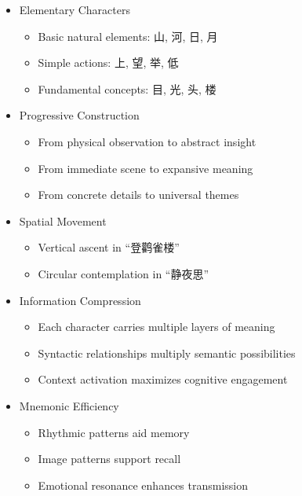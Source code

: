 \documentclass[
  11pt,
  letterpaper,
]{article}
\providecommand{\tightlist}{%
  \setlength{\itemsep}{0pt}\setlength{\parskip}{0pt}}
\begin{document}
\begin{itemize}
\tightlist
\item
  Elementary Characters

  \begin{itemize}
  \tightlist
  \item
    Basic natural elements: 山, 河, 日, 月
  \item
    Simple actions: 上, 望, 举, 低
  \item
    Fundamental concepts: 目, 光, 头, 楼
  \end{itemize}
\item
  Progressive Construction

  \begin{itemize}
  \tightlist
  \item
    From physical observation to abstract insight
  \item
    From immediate scene to expansive meaning
  \item
    From concrete details to universal themes
  \end{itemize}
\item
  Spatial Movement

  \begin{itemize}
  \tightlist
  \item
    Vertical ascent in ``登鹳雀楼''
  \item
    Circular contemplation in ``静夜思''
  \end{itemize}
\item
  Information Compression

  \begin{itemize}
  \tightlist
  \item
    Each character carries multiple layers of meaning
  \item
    Syntactic relationships multiply semantic possibilities
  \item
    Context activation maximizes cognitive engagement
  \end{itemize}
\item
  Mnemonic Efficiency

  \begin{itemize}
  \tightlist
  \item
    Rhythmic patterns aid memory
  \item
    Image patterns support recall
  \item
    Emotional resonance enhances transmission
  \end{itemize}
\end{itemize}
\end{document}
